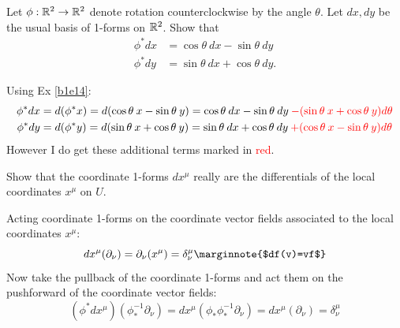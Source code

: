 \documentclass[10pt]{article}
\begin{document}
\begin{example}
	Let $\phi:\mathbb{R}^2\to\mathbb{R}^2$ denote rotation counterclockwise by the angle $\theta$. Let $dx,dy$ be the usual basis of 1-forms on $\mathbb{R}^2$. Show that
	$$
		\begin{aligned}
			\phi^*dx &= \cos\theta\:dx - \sin\theta\:dy\\
			\phi^*dy &= \sin\theta\:dx + \cos\theta\:dy.
		\end{aligned}
	$$
\end{example}
\sol Using Ex \ref{b1e14}:
$$
\begin{aligned}
	\phi^*dx &= d(\phi^*x) = d(\cos\theta\:x-\sin\theta\:y) = \cos\theta\:dx - \sin\theta\:dy \:\textcolor{red}{- (\sin\theta\:x + \cos\theta\:y)d\theta}\\
	\phi^*dy &= d(\phi^*y) = d(\sin\theta\:x+\cos\theta\:y) = \sin\theta\:dx + \cos\theta\:dy \:\textcolor{red}{+ (\cos\theta\:x - \sin\theta\:y)d\theta}
\end{aligned}
$$
However I do get these additional terms marked in \textcolor{red}{red}.


\begin{example}
	Show that the coordinate 1-forms $dx^\mu$ really are the differentials of the local coordinates $x^\mu$ on $U$.
\end{example}
\sol Acting coordinate 1-forms on the coordinate vector fields associated to the local coordinates $x^\mu$:
$$dx^\mu(\partial_\nu) = \partial_\nu(x^\mu) = \delta^\mu_\nu\marginnote{$df(v)=vf$}$$
Now take the pullback of the coordinate 1-forms and act them on the pushforward of the coordinate vector fields:
$$(\phi^*dx^\mu)(\phi^{-1}_*\partial_\nu) = dx^\mu(\phi_*\phi^{-1}_*\partial_\nu) = dx^\mu(\partial_\nu)=\delta^\mu_\nu$$
\end{document}
